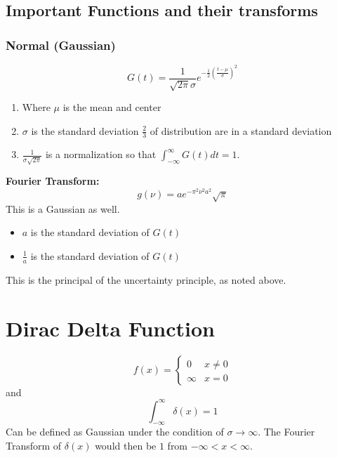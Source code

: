 \subsection{Important Functions and their transforms}
\subsubsection{Normal (Gaussian)}
\begin{equation}
G(t)=\frac{1}{\sqrt{2 \pi}\sigma}e^{-\frac{1}{2}{(\frac{t-\mu}{\sigma})}^2}
\end{equation}
\begin{enumerate}
	\item Where $ \mu $  is the mean and center 
	\item $ \sigma $ is the standard deviation $ \frac{2}{3} $ of distribution are in a standard deviation
	\item $ \frac{1}{\sigma\sqrt{2 \pi}} $ is a normalization so that $ \int_{-\infty}^{\infty}G(t)dt=1 $.
\end{enumerate}
\textbf{Fourier Transform:}
\begin{equation}
	g(\nu)=ae^{-\pi^2 \nu^2 a^2}\sqrt{\pi}
\end{equation}
This is a Gaussian as well. 

\begin{itemize}
	\item $ a $ is the standard deviation of $ G(t) $ 
	\item $ \frac{1}{a} $ is the standard deviation of $ G(t) $ 
\end{itemize}
This is the principal of the uncertainty principle, as noted above.

\section{Dirac Delta Function}
\begin{equation}
	f(x)=
	\begin{cases}
		0 & x\neq 0\\
		\infty & x=0
	\end{cases}
\end{equation}
and
\begin{equation}
	\int_{-\infty}^{\infty}\delta(x)=1
\end{equation}
Can be defined as Gaussian under the condition of $ \sigma \to\infty $. The Fourier Transform of $ \delta(x) $ would then be $ 1 $ from $ -\infty<x<\infty $.




